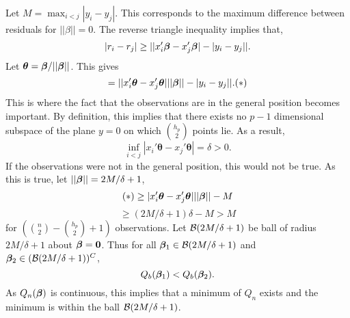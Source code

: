 \noindent Let $M = \max_{i<j} |y_i - y_j|$. This corresponds to the maximum difference between residuals for $||\beta|| = 0$. The reverse triangle inequality implies that,
$$ |r_i - r_j| \geq ||x_i'\bm{\beta} - x_j'\bm{\beta}| - |y_i - y_j||.$$
Let $\boldsymbol{\theta} = \bm{\beta} / ||\bm{\beta}||$. This gives
$$ = ||x_i'\boldsymbol{\theta} - x_j'\boldsymbol{\theta}| ||\bm{\beta}|| - |y_i - y_j||. (*)$$
This is where the fact that the observations are in the general position becomes important. By definition, this implies that there exists no $p-1$ dimensional subspace of the plane $y=0$ on which $\binom{h_p}{2}$ points lie. As a result, 
$$ \inf_{i<j} |x_i'\boldsymbol{\theta} - x_j'\boldsymbol{\theta}| = \delta > 0. $$
If the observations were not in the general position, this would not be true. As this is true, let $||\bm{\beta}|| = 2M/\delta + 1$,
$$ (*) \geq |x_i'\boldsymbol{\theta} - x_j'\boldsymbol{\theta}| ||\bm{\beta}|| - M$$
$$ \geq (2M/\delta + 1)\delta - M > M$$
for $(\binom{n}{2} - \binom{h_p}{2} + 1)$ observations. Let $\mathcal{B}(2M/\delta + 1)$ be ball of radius $2M/\delta + 1$ about $\bm{\beta} = \boldsymbol{0}$. Thus for all $\bm{\beta}_1 \in \mathcal{B}(2M/\delta + 1)$ and $\bm{\beta}_2 \in (\mathcal{B}(2M/\delta + 1))^C$, 
$$Q_b(\bm{\beta}_1) < Q_b(\bm{\beta}_2).$$ 
As $Q_n(\bm{\beta})$ is continuous, this implies that a minimum of $Q_n$ exists and the minimum is within the ball $\mathcal{B}(2M/\delta + 1)$.